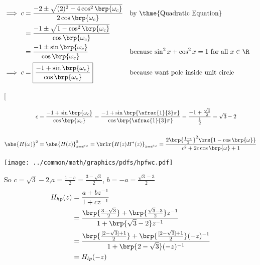 {\begin{align*}
  \\\implies c &= \frac{-2 \pm \sqrt{(2)^2 -4\cos^2\brp{\omega_c}}}
                       {2\cos\brp{\omega_c}}
               && \text{by \thme{Quadratic Equation}}
             \\&= \frac{-1 \pm \sqrt{1 -\cos^2\brp{\omega_c}}}
                       {\cos\brp{\omega_c}}
             \\&= \frac{-1 \pm \sin\brp{\omega_c}}
                       {\cos\brp{\omega_c}}
               && \text{because $\sin^2x + \cos^2x = 1$ for all $x\in\R$}
  \\\implies c &=
      \boxed{\frac{-1 + \sin\brp{\omega_c}}
                    {\cos\brp{\omega_c}}}
               && \text{because want pole inside unit circle}
\end{align*}}




\begin{example}[

{\begin{align*}
  c &= \frac{-1 + \sin\brp{\omega_c}}{\cos\brp{\omega_c}}
     = \frac{-1 + \sin\brp{\sfrac{1}{3}\pi}}{\cos\brp{\sfrac{1}{3}\pi}}
     = \frac{-1 + \frac{\sqrt{3}}{2}}{\frac{1}{2}}
     = \sqrt{3} - 2
  \\
  \\
  \abs{H(\omega)}^2
    &= \abs{H(z)}^2_{z=e^{i\omega}}
     = \brlr{H(z)H^\ast(z)}_{z=e^{i\omega}}
     = \frac{2\brp{\frac{1-c}{2}}^2\brs{1 -  \cos\brp{\omega}}}
            {c^2 + 2 c\cos\brp{\omega} + 1}
\end{align*}}

\texttt{[image: ../common/math/graphics/pdfs/hpfwc.pdf]}
\end{example}


So $c=\sqrt{3}-2$,\qquad $a=\frac{1-c}{2}=\frac{3-\sqrt{3}}{2}$, \qquad $b=-a=\frac{\sqrt{3}-3}{2}$
\begin{align*}
  H_{hp}(z)
    &= \frac{a + bz^{-1}}{1+cz^{-1}}
  \\&= \frac{\brp{\frac{3-\sqrt{3}}{2}} + \brp{\frac{\sqrt{3}-3}{2}}z^{-1}}
            {1+\brp{\sqrt{3}-2}z^{-1}}
  \\&= \frac{\brp{\frac{[2-\sqrt{3}]+1}{2}} + \brp{\frac{[2-\sqrt{3}]+1}{2}}(-z)^{-1}}
            {1+\brp{2-\sqrt{3}}(-z)^{-1}}
  \\&= H_{lp}(-z)
\end{align*}







